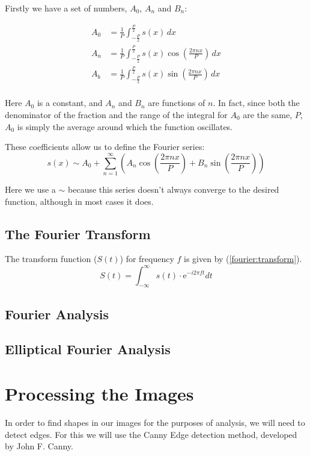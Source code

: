 \documentclass[12pt,english]{article}
\begin{document}
Firstly we have a set of numbers, \(A_0\), \(A_n\) and \(B_n\):

\begin{equation}
\begin{aligned}
	A_0 &= \frac{1}{P} \int_{-\frac{P}{2}}^{\frac{P}{2}}
		s(x) \,dx \\
	A_n &= \frac{1}{P} \int_{-\frac{P}{2}}^{\frac{P}{2}}
		s(x) \cos \left(\frac{2\pi nx}{P}\right) \,dx \\
	A_b &= \frac{1}{P} \int_{-\frac{P}{2}}^{\frac{P}{2}}
		s(x) \sin \left(\frac{2\pi nx}{P}\right) \,dx \\
\end{aligned}
\end{equation}

Here \(A_0\) is a constant, and \(A_n\) and \(B_n\) are functions of \(n\).
In fact, since both the denominator of the fraction and the range of the integral for \(A_0\) are the same, \(P\),
\(A_0\) is simply the average around which the function oscillates.

These coefficients allow us to define the Fourier series:
\begin{equation}
	s(x) \sim A_0 + \sum_{n=1}^{\infty} \left(
		A_n \cos \left( \frac{2\pi nx}{P} \right) +
		B_n \sin \left( \frac{2\pi nx}{P} \right)
	\right)
\end{equation}

Here we use a \(\sim\) because this series doesn't always converge to the desired function, although in most cases it
does.

\subsection{The Fourier Transform}
The transform function ($S(t)$) for frequency $f$ is given by
(\ref{fourier:transform}).
\begin{equation} \label{fourier:transform}
	S(t)=\int_{-\infty}^{\infty}s(t)\cdot \mathrm{e}^{-i2\pi ft} dt
\end{equation}

\subsection{Fourier Analysis}

\subsection{Elliptical Fourier Analysis}

\section{Processing the Images}
In order to find shapes in our images for the purposes of analysis,
we will need to detect edges. For this we will use the Canny Edge
detection method, developed by John F. Canny.
\end{document}
